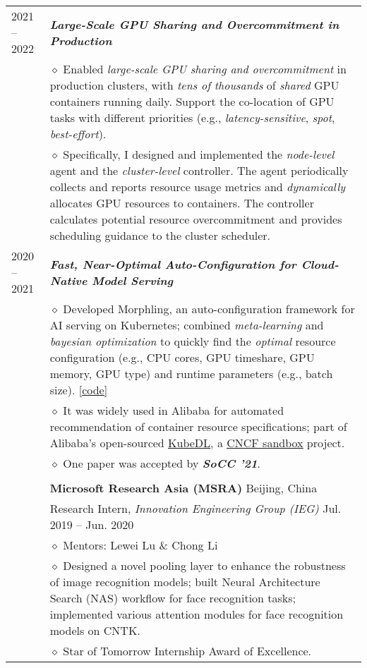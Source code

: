\documentclass[letterpaper, 12pt]{article}
\begin{document}
\begin{longtable}{p{1.0in}p{5.8in}}
2021 -- 2022
& \textbf{\emph{Large-Scale GPU Sharing and Overcommitment in Production}} \\
    & $\diamond$ Enabled \textit{large-scale GPU sharing and overcommitment} in production clusters, with \textit{tens of thousands }of \textit{shared} GPU containers running daily. Support the co-location of GPU tasks with different priorities (e.g., \textit{latency-sensitive}, \textit{spot}, \textit{best-effort}). \\
    & $\diamond$ Specifically, I designed and implemented the \textit{node-level} agent and the \textit{cluster-level} controller. The agent periodically collects and reports resource usage metrics and \textit{dynamically} allocates GPU resources to containers. The controller calculates potential resource overcommitment and provides scheduling guidance to the cluster scheduler. \\

2020 -- 2021
& \textbf{\emph{Fast, Near-Optimal Auto-Configuration for Cloud-Native Model Serving}} \\
    & $\diamond$ Developed Morphling, an auto-configuration framework for AI serving on Kubernetes; combined \textit{meta-learning} and \textit{bayesian optimization} to quickly find the \textit{optimal} resource configuration (e.g., CPU cores, GPU timeshare, GPU memory, GPU type) and runtime parameters (e.g., batch size). [\href{https://github.com/kubedl-io/morphling}{\underline{code}}] \\
    & $\diamond$ It was widely used in Alibaba for automated recommendation of container resource specifications; part of Alibaba's open-sourced \href{https://github.com/kubedl-io/kubedl}{\underline{KubeDL}}, a \href{https://landscape.cncf.io/?item=provisioning--automation-configuration--kubedl}{\underline{CNCF sandbox}} project. \\
    & $\diamond$ One paper was accepted by \textbf{\emph{SoCC '21}}. \\

\\

& {\textbf{Microsoft Research Asia (MSRA)}} \hfill Beijing, China\\
& Research Intern, \textit{Innovation Engineering Group (IEG)} \hfill Jul. 2019 -- Jun. 2020 \\
    & $\diamond$ Mentors: Lewei Lu \& Chong Li \\
    & $\diamond$ Designed a novel pooling layer to enhance the robustness of image recognition models; built Neural Architecture Search (NAS) workflow for face recognition tasks; implemented various attention modules for face recognition models on CNTK. \\
    & $\diamond$ Star of Tomorrow Internship Award of Excellence. \\


\end{longtable}
\end{document}
